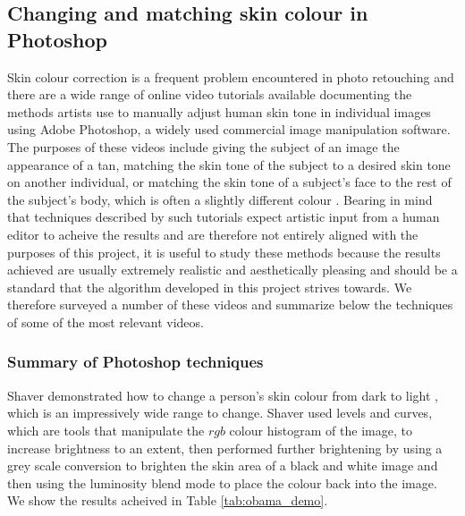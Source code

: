 \subsection{Changing and matching skin colour in Photoshop}

Skin colour correction is a frequent problem encountered in photo retouching and there are a wide range of online video tutorials available documenting the methods artists use to manually adjust human skin tone in individual images using Adobe Photoshop, a widely used commercial image manipulation software. The purposes of these videos include giving the subject of an image the appearance of a tan, matching the skin tone of the subject to a desired skin tone on another individual, or matching the skin tone of a subject's face to the rest of the subject's body, which is often a slightly different colour \cite{photoshop:tan, photoshop:match_other, photoshop:match_body}. Bearing in mind that techniques described by such tutorials expect artistic input from a human editor to acheive the results and are therefore not entirely aligned with the purposes of this project, it is useful to study these methods because the results achieved are usually extremely realistic and aesthetically pleasing and should be a standard that the algorithm developed in this project strives towards. We therefore surveyed a number of these videos and summarize below the techniques of some of the most relevant videos.

\subsubsection*{Summary of Photoshop techniques}

Shaver demonstrated how to change a person's skin colour from dark to light \cite{photoshop:obama}, which is an impressively wide range to change. Shaver used levels and curves, which are tools that manipulate the $rgb$ colour histogram of the image, to increase brightness to an extent, then performed further brightening by using a grey scale conversion to brighten the skin area of a black and white image and then using the luminosity blend mode to place the colour back into the image. We show the results acheived in Table \ref{tab:obama_demo}.

